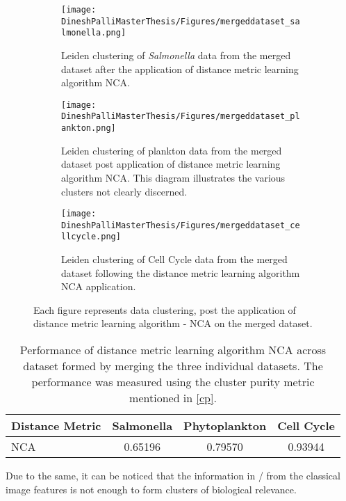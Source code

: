\documentclass[12pt,a4paper]{article}
\begin{document}
\begin{figure}
  \centering
  \begin{subfigure}{\linewidth}
    \texttt{[image: DineshPalliMasterThesis/Figures/mergeddataset\_salmonella.png]}
    \caption{Leiden clustering of \textit{Salmonella} data from the merged dataset after the application of distance metric learning algorithm NCA.}
    \label{multifig5:image_a}
  \end{subfigure}
  \hfill
  \begin{subfigure}{\linewidth}
    \texttt{[image: DineshPalliMasterThesis/Figures/mergeddataset\_plankton.png]}
    \caption{Leiden clustering of plankton data from the merged dataset post application of distance metric learning algorithm NCA. This diagram illustrates the various clusters not clearly discerned.}
    \label{multifig5:image_b}
  \end{subfigure}
  \hfill
  \begin{subfigure}{\linewidth}
    \texttt{[image: DineshPalliMasterThesis/Figures/mergeddataset\_cellcycle.png]}
    \caption{Leiden clustering of Cell Cycle data from the merged dataset following the distance metric learning algorithm NCA application.}
    \label{multifig5:image_c}
  \end{subfigure}
  \caption[Clustering on merged dataset]{Each figure represents data clustering, post the application of distance metric learning algorithm - NCA on the merged dataset.}
  \label{multifig5:mergeddataset_clusters}
\end{figure}


\begin{table}[h]
\small
\centering
\caption{Performance of distance metric learning algorithm NCA across dataset formed by merging the three individual datasets. The performance was measured using the cluster purity metric mentioned in \ref{cp}.}
\label{tab:DMLonmergeddataset}
\begin{tabular}{lccc}
\hline
\textbf{Distance Metric} & \textbf{Salmonella} & \textbf{Phytoplankton} & \textbf{Cell Cycle} \\
\hline
NCA & 0.65196 & 0.79570 & 0.93944 \\
\hline
\end{tabular}
\end{table}


Due to the same, it can be noticed that the information in / from the classical image features is not enough to form clusters of biological relevance.
\end{document}
